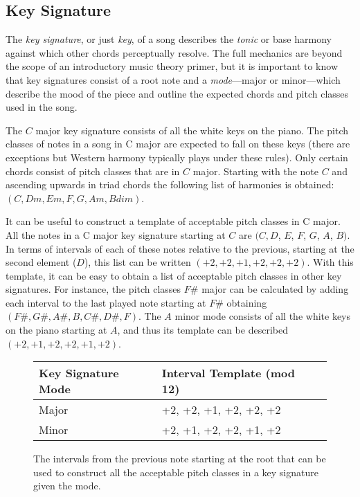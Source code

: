 \subsection{Key Signature}

The \textit{key signature}, or just \textit{key}, of a song describes the \textit{tonic} or base harmony against which other chords perceptually resolve. The full mechanics are beyond the scope of an introductory music theory primer, but it is important to know that key signatures consist of a root note and a \textit{mode}---major or minor---which describe the mood of the piece and outline the expected chords and pitch classes used in the song.

The $C$ major key signature consists of all the white keys on the piano. The pitch classes of notes in a song in C major are expected to fall on these keys (there are exceptions but Western harmony typically plays under these rules). Only certain chords consist of pitch classes that are in $C$ major. Starting with the note $C$ and ascending upwards in triad chords the following list of harmonies is obtained: $(C, Dm, Em, F, G, Am, Bdim)$.

It can be useful to construct a template of acceptable pitch classes in C major. All the notes in a C major key signature starting at $C$ are $(C, D$, $E$, $F$, $G$, $A$, $B)$. In terms of intervals of each of these notes relative to the previous, starting at the second element ($D$), this list can be written $(+2, +2, +1, +2, +2, +2)$. With this template, it can be easy to obtain a list of acceptable pitch classes in other key signatures. For instance, the pitch classes $F\#$ major can be calculated by adding each interval to the last played note starting at $F\#$ obtaining $(F\#,G\#,A\#,B,C\#,D\#,F)$. The $A$ minor mode consists of all the white keys on the piano starting at $A$, and thus its template can be described $(+2,+1,+2,+2,+1,+2)$.

\begin{figure}
\centering
\begin{tabular}{lll}
\toprule
Key Signature Mode        & Interval Template (mod 12) \\
\midrule
Major       & +2, +2, +1, +2, +2, +2 \\
Minor       & +2, +1, +2, +2, +1, +2 \\
\bottomrule
\end{tabular}
\caption[Key Signature Mode Intervals]{The intervals from the previous note starting at the root that can be used to construct all the acceptable pitch classes in a key signature given the mode.}
\label{ref:figkeysig}
\end{figure}
